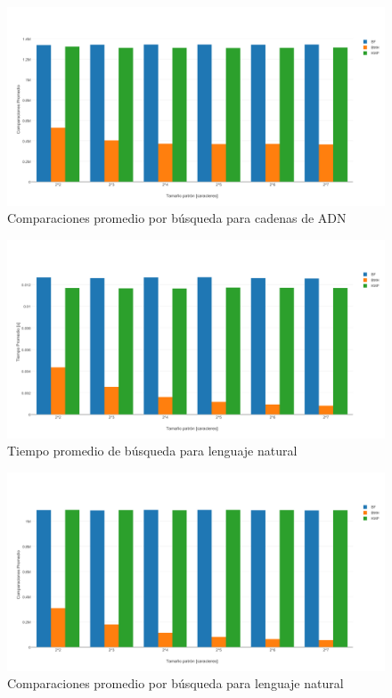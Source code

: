 \documentclass[14pt,letterpaper,hidelinks]{extarticle}
\begin{document}
			\newpage
		\begin{figure}[ht!]
			\centering
			\includegraphics[scale=0.5]{img/cRDNA.pdf}
			\caption{Comparaciones promedio por búsqueda para cadenas de ADN} \label{construccion}
		\end{figure}

	\newpage
		\begin{figure}[ht!]
			\centering
			\includegraphics[scale=0.5]{img/tRLNG.pdf}
			\caption{Tiempo promedio de búsqueda para lenguaje natural} \label{construccion}
		\end{figure}
			\newpage
		\begin{figure}[ht!]
			\centering
			\includegraphics[scale=0.5]{img/cRLNG.pdf}
			\caption{Comparaciones promedio por búsqueda para lenguaje natural} \label{construccion}
		\end{figure}
\end{document}
